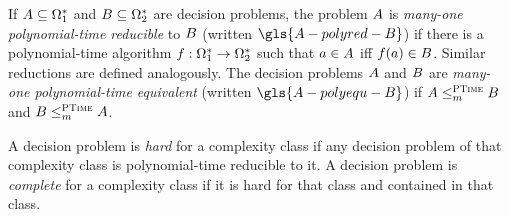 
If $A \subseteq \Omega^{*}_1$ and $B \subseteq \Omega^{*}_2$ are
decision problems, the problem $A$ is \emph{many-one polynomial-time
reducible} to $B$ (written $\gls{A-polyred-B}$) if there is a polynomial-time
algorithm $f : \Omega^{*}_1 \to \Omega^{*}_2$ such that $a \in A$ iff
$f(a) \in B$. Similar reductions are defined analogously.
The decision problems $A$ and $B$ are \emph{many-one polynomial-time
equivalent} (written $\gls{A-polyequ-B}$) if $A \leq_m^{\text{\normalfont{\scshape PTime}}} B$ and
$B \leq_m^{\text{\normalfont{\scshape PTime}}} A$.

A decision problem is \emph{hard} for a complexity class if any decision problem
of that complexity class is polynomial-time reducible to it. A decision problem
is \emph{complete} for a complexity class if it is hard for that class and
contained in that class.